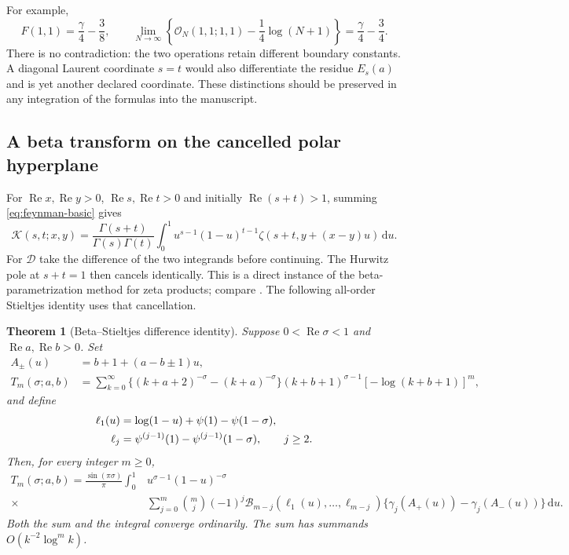\documentclass[11pt,a4paper]{article}
\numberwithin{equation}{section}
\newtheorem{theorem}{Theorem}[section]
\theoremstyle{definition}
\theoremstyle{remark}
\newcommand{\dd}{\,\mathrm d}
\newcommand{\Rea}{\operatorname{Re}}
\newcommand{\Ord}{\mathcal O}
\newcommand{\Kern}{\mathcal K}
\newcommand{\Def}{\mathcal D}
\newcommand{\Bell}{\mathcal B}
\begin{document}
For example,
\[
 F(1,1)=\frac{\gamma}{4}-\frac38,\qquad
 \lim_{N\to\infty}\left\{\Ord_N(1,1;1,1)-\frac14\log(N+1)\right\}
 =\frac{\gamma}{4}-\frac34.
\]
There is no contradiction: the two operations retain different
boundary constants. A diagonal Laurent coordinate $s=t$ would also
differentiate the residue $E_s(a)$ and is yet another declared
coordinate. These distinctions should be preserved in any integration
of the formulas into the manuscript.

\subsection{A beta transform on the cancelled polar hyperplane}

For $\Rea x,\Rea y>0$, $\Rea s,\Rea t>0$ and initially
$\Rea(s+t)>1$, summing
\eqref{eq:feynman-basic} gives
\begin{equation}\label{eq:k-beta}
 \Kern(s,t;x,y)=\frac{\Gamma(s+t)}{\Gamma(s)\Gamma(t)}
 \int_0^1u^{s-1}(1-u)^{t-1}
       \zeta(s+t,y+(x-y)u)\dd u.
\end{equation}
For $\Def$ take the difference of the two integrands before
continuing. The Hurwitz pole at $s+t=1$ then cancels identically.
This is a direct instance of the beta-parametrization method for
zeta products; compare \cite{shpot-paris}. The following all-order
Stieltjes identity uses that cancellation.

\begin{theorem}[Beta--Stieltjes difference identity]\label{thm:beta-stieltjes}
Suppose $0<\Rea\sigma<1$ and $\Rea a,\Rea b>0$. Set
\begin{align*}
 A_\pm(u)&=b+1+(a-b\pm1)u,\\
 T_m(\sigma;a,b)&=\sum_{k=0}^{\infty}
 \{(k+a+2)^{-\sigma}-(k+a)^{-\sigma}\}
 (k+b+1)^{\sigma-1}[-\log(k+b+1)]^m,
\end{align*}
and define
\begin{align}
 \ell_1(u)&=\log(1-u)+\psi(1)-\psi(1-\sigma),\notag\\
 \ell_j&=\psi^{(j-1)}(1)-\psi^{(j-1)}(1-\sigma),\qquad j\ge2.
 \label{eq:beta-ells}
\end{align}
Then, for every integer $m\ge0$,
\begin{equation}\label{eq:beta-stieltjes-all}
 \begin{split}
 T_m(\sigma;a,b)=\frac{\sin(\pi\sigma)}{\pi}
 \int_0^1&u^{\sigma-1}(1-u)^{-\sigma}\\[-2pt]
 {}\times&\sum_{j=0}^{m}\binom mj(-1)^j
 \Bell_{m-j}(\ell_1(u),\ldots,\ell_{m-j})
 \{\gamma_j(A_+(u))-\gamma_j(A_-(u))\}\dd u.
 \end{split}
\end{equation}
Both the sum and the integral converge ordinarily. The sum has
summands $O(k^{-2}\log^m k)$.
\end{theorem}
\end{document}
